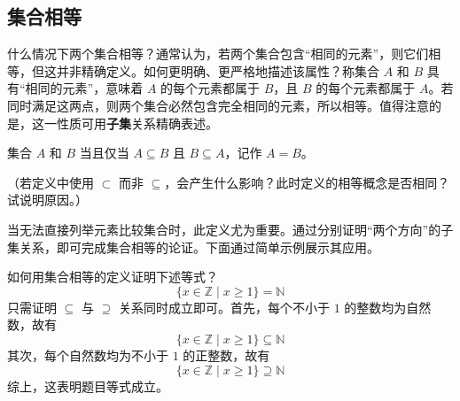 \subsection{集合相等}

什么情况下两个集合相等？通常认为，若两个集合包含``相同的元素''，则它们相等，但这并非精确定义。如何更明确、更严格地描述该属性？称集合 $A$ 和 $B$ 具有``相同的元素''，意味着 $A$ 的每个元素都属于 $B$，且 $B$ 的每个元素都属于 $A$。若同时满足这两点，则两个集合必然包含完全相同的元素，所以相等。值得注意的是，这一性质可用\textbf{子集}关系精确表述。

\begin{definition}
    集合 $A$ 和 $B$ 当且仅当 $A \subseteq B$ 且 $B \subseteq A$，记作 $A = B$。
\end{definition}

（若定义中使用 $\subset$ 而非 $\subseteq$，会产生什么影响？此时定义的相等概念是否相同？试说明原因。）

当无法直接列举元素比较集合时，此定义尤为重要。通过分别证明``两个方向''的子集关系，即可完成集合相等的论证。下面通过简单示例展示其应用。

\begin{example}
    如何用集合相等的定义证明下述等式？
    \[\{x \in \mathbb{Z} \mid x \ge 1\} = \mathbb{N}\]
    只需证明 $\subseteq$ 与 $\supseteq$ 关系同时成立即可。首先，每个不小于 $1$ 的整数均为自然数，故有
    \[\{x \in \mathbb{Z} \mid x \ge 1\} \subseteq \mathbb{N}\]
    其次，每个自然数均为不小于 $1$ 的正整数，故有
    \[\{x \in \mathbb{Z} \mid x \ge 1\} \supseteq \mathbb{N}\]
    综上，这表明题目等式成立。
\end{example}
